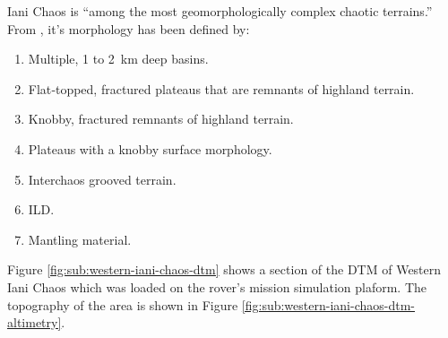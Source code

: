 Iani Chaos is ``among the most geomorphologically complex chaotic terrains.'' From  , it's morphology has been defined by:

\begin{enumerate}[label=\textbf{\textcolor{BulletBlue}{(\alph*)}}]
    \item Multiple, 1 to \SI{2}{\kilo\meter} deep basins.
    \item Flat‐topped, fractured plateaus that are remnants of highland terrain.
    \item Knobby, fractured remnants of highland terrain.
    \item Plateaus with a knobby surface morphology.
    \item Interchaos grooved terrain.
    \item \ac{ILD}.
    \item Mantling material.
\end{enumerate}

Figure \ref{fig:sub:western-iani-chaos-dtm} shows a section of the \ac{DTM} of Western Iani Chaos which was loaded on the rover's mission simulation plaform. The topography of the area is shown in Figure \ref{fig:sub:western-iani-chaos-dtm-altimetry}.

\vspace{0.5cm}


